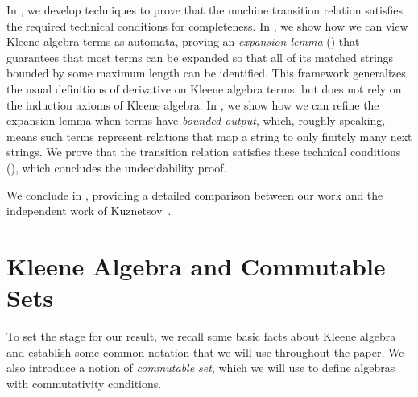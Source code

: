 \documentclass[11pt,a4paper]{amsart}
\theoremstyle{definition}
\begin{document}
In , we develop techniques to prove that the
machine transition relation satisfies the required technical conditions for
completeness. In , we show how we can view Kleene algebra
terms as automata, proving an \emph{expansion lemma} () that
guarantees that most terms can be expanded so that all of its matched strings
bounded by some maximum length can be identified.  This framework generalizes
the usual definitions of derivative on Kleene algebra terms, but does not rely
on the induction axioms of Kleene algebra.  In , we
show how we can refine the expansion lemma when terms have
\emph{bounded-output}, which, roughly speaking, means such terms represent
relations that map a string to only finitely many next strings.  We prove that
the transition relation satisfies these technical conditions
(), which concludes the undecidability proof.

We conclude in , providing a detailed comparison between
our work and the independent work of Kuznetsov~\cite{Kuznetsov23}.

\section{Kleene Algebra and Commutable Sets}
\label{sec:preliminaries}

To set the stage for our result, we recall some basic facts about Kleene algebra
and establish some common notation that we will use throughout the paper.  We
also introduce a notion of \emph{commutable set}, which we will use to define
algebras with commutativity conditions.
\end{document}

